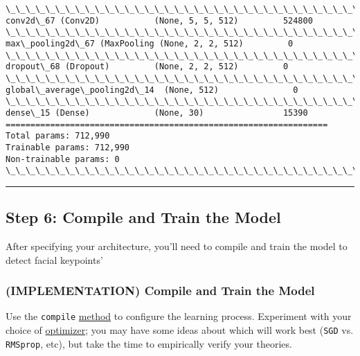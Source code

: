 \documentclass[11pt]{article}
\begin{document}
\begin{Verbatim}[commandchars=\\\{\}]
\_\_\_\_\_\_\_\_\_\_\_\_\_\_\_\_\_\_\_\_\_\_\_\_\_\_\_\_\_\_\_\_\_\_\_\_\_\_\_\_\_\_\_\_\_\_\_\_\_\_\_\_\_\_\_\_\_\_\_\_\_\_\_\_\_
conv2d\_67 (Conv2D)           (None, 5, 5, 512)         524800    
\_\_\_\_\_\_\_\_\_\_\_\_\_\_\_\_\_\_\_\_\_\_\_\_\_\_\_\_\_\_\_\_\_\_\_\_\_\_\_\_\_\_\_\_\_\_\_\_\_\_\_\_\_\_\_\_\_\_\_\_\_\_\_\_\_
max\_pooling2d\_67 (MaxPooling (None, 2, 2, 512)         0         
\_\_\_\_\_\_\_\_\_\_\_\_\_\_\_\_\_\_\_\_\_\_\_\_\_\_\_\_\_\_\_\_\_\_\_\_\_\_\_\_\_\_\_\_\_\_\_\_\_\_\_\_\_\_\_\_\_\_\_\_\_\_\_\_\_
dropout\_68 (Dropout)         (None, 2, 2, 512)         0         
\_\_\_\_\_\_\_\_\_\_\_\_\_\_\_\_\_\_\_\_\_\_\_\_\_\_\_\_\_\_\_\_\_\_\_\_\_\_\_\_\_\_\_\_\_\_\_\_\_\_\_\_\_\_\_\_\_\_\_\_\_\_\_\_\_
global\_average\_pooling2d\_14  (None, 512)               0         
\_\_\_\_\_\_\_\_\_\_\_\_\_\_\_\_\_\_\_\_\_\_\_\_\_\_\_\_\_\_\_\_\_\_\_\_\_\_\_\_\_\_\_\_\_\_\_\_\_\_\_\_\_\_\_\_\_\_\_\_\_\_\_\_\_
dense\_15 (Dense)             (None, 30)                15390     
=================================================================
Total params: 712,990
Trainable params: 712,990
Non-trainable params: 0
\_\_\_\_\_\_\_\_\_\_\_\_\_\_\_\_\_\_\_\_\_\_\_\_\_\_\_\_\_\_\_\_\_\_\_\_\_\_\_\_\_\_\_\_\_\_\_\_\_\_\_\_\_\_\_\_\_\_\_\_\_\_\_\_\_

    \end{Verbatim}

    \begin{center}\rule{0.5\linewidth}{\linethickness}\end{center}

\subsection{Step 6: Compile and Train the
Model}\label{step-6-compile-and-train-the-model}

After specifying your architecture, you'll need to compile and train the
model to detect facial keypoints'

    \subsubsection{(IMPLEMENTATION) Compile and Train the
Model}\label{implementation-compile-and-train-the-model}

Use the \texttt{compile}
\href{https://keras.io/models/sequential/\#sequential-model-methods}{method}
to configure the learning process. Experiment with your choice of
\href{https://keras.io/optimizers/}{optimizer}; you may have some ideas
about which will work best (\texttt{SGD} vs. \texttt{RMSprop}, etc), but
take the time to empirically verify your theories.
\end{document}
